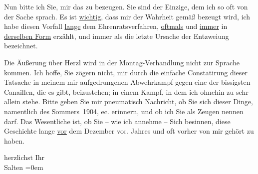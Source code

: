 \pstart
           Nun bitte ich Sie, mir das zu bezeugen. Sie sind der Einzige, dem ich so oft von der
               Sache sprach. Es ist \uline{wichtig}, dass mir der Wahrheit
               gemäß bezeugt wird, ich habe diesen Vorfall \uline{lange}{ } dem Ehrenratsverfahren, \uline{oftmals} und \uline{immer} in \uline{der{\pb}selben Form} erzählt, und immer als die letzte Ursache der Entzweiung
               bezeichnet.\pend
           
\pstart
           Die Äußerung über Herzl wird in der Montag-Verhandlung nicht zur Sprache kommen. Ich hoffe,
               Sie zögern nicht, mir durch die einfache Constatirung dieser Tatsache in meinem \introOben{}mir\introOben{} aufgedrungenen Abwehrkampf gegen eine der bissigsten
               Canaillen, die es gibt, beizustehen; in einem Kampf, in dem ich ohnehin zu sehr
               allein stehe. Bitte geben Sie mir pneumatisch Nachricht, ob Sie sich dieser Dinge,
               namentlich des Sommers 1904, ec. erinnern, und ob ich Sie
               als Zeugen nennen darf. Das Wesentliche ist, ob Sie – wie ich annehme – Sich
               besinnen, diese Geschichte lange \uline{vor} dem Dezember vo\textcolor{gray}{r.} Jahres und oft vorher von
               mir gehört zu haben.\pend
           
\pstart
           herzlichst Ihr {\\[\baselineskip]}\spacefill\mbox{Salten}\pend
           \leftskip=0em{}\endnumbering{}  \newcommand{\dateiname}{L03434}\newcommand{\titel}{Felix Salten an Arthur Schnitzler, [18.? 10. 1906]}\newcommand{\editorInnen}{Martin Anton Müller und Laura Untner}
